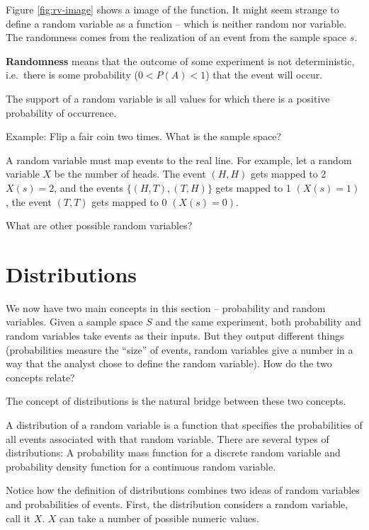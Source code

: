 \documentclass[
]{book}
\begin{document}
Figure \ref{fig:rv-image} shows a image of the function. It might seem strange to define a random variable as a function -- which is neither random nor variable. The randomness comes from the realization of an event from the sample space \(s\).

\textbf{Randomness} means that the outcome of some experiment is not deterministic, i.e.~there is some probability (\(0 < P(A) < 1\)) that the event will occur.

The support of a random variable is all values for which there is a positive probability of occurrence.

Example: Flip a fair coin two times. What is the sample space?

A random variable must map events to the real line. For example, let a random variable \(X\) be the number of heads. The event \((H, H)\) gets mapped to 2 \(X(s) = 2\), and the events \(\{(H, T), (T, H)\}\) gets mapped to 1 \((X(s) = 1)\), the event \((T, T)\) gets mapped to 0 \((X(s) = 0)\).

What are other possible random variables?

\hypertarget{distributions}{%
\section{Distributions}\label{distributions}}

We now have two main concepts in this section -- probability and random variables. Given a sample space \(S\) and the same experiment, both probability and random variables take events as their inputs. But they output different things (probabilities measure the ``size'' of events, random variables give a number in a way that the analyst chose to define the random variable). How do the two concepts relate?

The concept of distributions is the natural bridge between these two concepts.

\begin{definition}
\protect\hypertarget{def:unnamed-chunk-72}{}\label{def:unnamed-chunk-72}A distribution of a random variable is a function that specifies the probabilities of all events associated with that random variable. There are several types of distributions: A probability mass function for a discrete random variable and probability density function for a continuous random variable.
\end{definition}

Notice how the definition of distributions combines two ideas of random variables and probabilities of events. First, the distribution considers a random variable, call it \(X\). \(X\) can take a number of possible numeric values.
\end{document}
